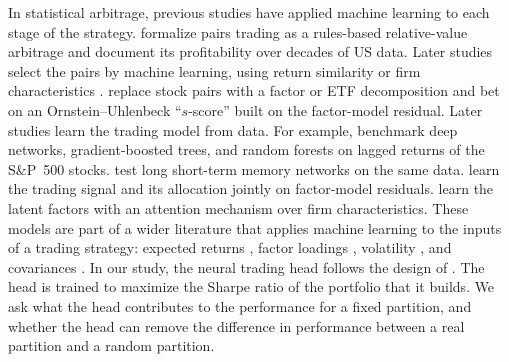 In statistical arbitrage, previous studies have applied machine learning to each stage of the strategy. \citet{Gatevetal2006} formalize pairs trading as a
rules-based relative-value arbitrage and document its profitability
over decades of US data. Later studies select the pairs by machine learning, using
return similarity \citep{SARMENTO2020113490} or firm
characteristics \citep{HAN2023929}.
\citet{avellaneda2010statistical} replace stock pairs with a factor or ETF
decomposition and bet on an Ornstein--Uhlenbeck ``$s$-score'' built on
the factor-model residual. Later studies learn the trading model from data.
For example, \citet{KRAUSS2017689} benchmark deep networks, gradient-boosted trees,
and random forests on lagged returns of the S\&P~500 stocks. \citet{FISCHER2018654} test long short-term memory networks on the same data.
\citet{guijarro2025deep} learn the trading signal and its allocation
jointly on factor-model residuals. \citet{epstein2025attention} learn the latent factors
with an attention mechanism over firm characteristics. These models are part of a wider literature that applies machine learning to the inputs of a trading strategy: expected returns \citep{10.1093/rfs/hhaa009}, factor loadings \citep{kelly2019characteristics}, volatility \citep{zhang2024volatility}, and covariances \citep{zhang2025graph}. In our study, the neural trading head follows the design of \citet{guijarro2025deep}. The head is trained to maximize the Sharpe ratio of the portfolio that it builds. We ask what the head contributes to the performance for a fixed partition, and whether the head can remove the difference in performance between a real partition and a random partition.

